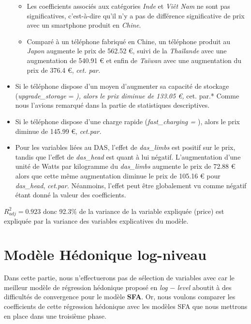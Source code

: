 \documentclass[
  12pt,
]{report}
\providecommand{\tightlist}{%
  \setlength{\itemsep}{0pt}\setlength{\parskip}{0pt}}\usepackage{longtable,booktabs,array}
\renewcommand{\texttt}[1]{\colorbox{light}{\color{highlight}{\ttfamily{#1}}}}
\begin{document}
\begin{itemize}
  \begin{itemize}
  \tightlist
  \item
    Les coefficients associés aux catégories \emph{Inde} et \emph{Viêt
    Nam} ne sont pas significatives, c'est-à-dire qu'il n'y a pas de
    différence significative de prix avec un smartphone produit en
    \emph{Chine}.
  \item
    Comparé à un téléphone fabriqué en Chine, un téléphone produit au
    \emph{Japon} augmente le prix de 562.52 €, suivi de la
    \emph{Thaïlande} avec une augmentation de 540.91 € et enfin de
    \emph{Taïwan} avec une augmentation du prix de 376.4 €, \emph{cet.
    par.}
  \end{itemize}
\item
  Si le téléphone dispose d'un moyen d'augmenter sa capacité de stockage
  (\emph{upgrade\_storage} = \texttt{TRUE}\emph{), alors le prix diminue
  de 133.05 €,} cet. par.* Comme nous l'avions remarqué dans la partie
  de statistiques descriptives.
\item
  Si le téléphone dispose d'une charge rapide (\emph{fast\_charging =
  \texttt{TRUE}}), alors le prix diminue de 145.99 €, \emph{cet.par.}
\item
  Pour les variables liées au DAS, l'effet de \emph{das\_limbs} est
  positif sur le prix, tandis que l'effet de \emph{das\_head} est quant
  à lui négatif. L'augmentation d'une unité de Watts par kilogramme du
  \emph{das\_limbs} augmente le prix de 72.88 € alors que cette même
  augmentation diminue le prix de 105.16 € pour \emph{das\_head},
  \emph{cet.par.} Néanmoins, l'effet peut être globalement vu comme
  négatif étant donné la valeur des coefficients.
\end{itemize}

\(R^2_{adj} = 0.923\) donc 92.3\% de la variance de la variable
expliquée (price) est expliquée par la variance des variables
explicatives du modèle.

\newpage

\section{Modèle Hédonique
log-niveau}\label{moduxe8le-huxe9donique-log-niveau}

Dans cette partie, nous n'effectuerons pas de sélection de variables
avec \texttt{\{glmulti\}} car le meilleur modèle de régression hédonique
proposé en \emph{log} \(-\) \emph{level} aboutit à des difficultés de
convergence pour le modèle \textbf{SFA}. Or, nous voulons comparer les
coefficients de cette régression hédonique avec les modèles SFA que nous
mettrons en place dans une troisième phase.
\end{document}
